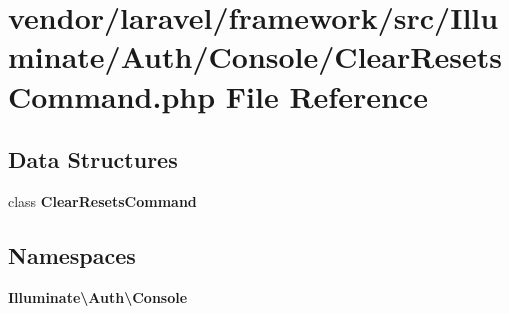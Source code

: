 \section{vendor/laravel/framework/src/\+Illuminate/\+Auth/\+Console/\+Clear\+Resets\+Command.php File Reference}
\label{_clear_resets_command_8php}
\subsection*{Data Structures}
\begin{DoxyCompactItemize}
\item 
class {\bf Clear\+Resets\+Command}
\end{DoxyCompactItemize}
\subsection*{Namespaces}
\begin{DoxyCompactItemize}
\item 
 {\bf Illuminate\textbackslash{}\+Auth\textbackslash{}\+Console}
\end{DoxyCompactItemize}

